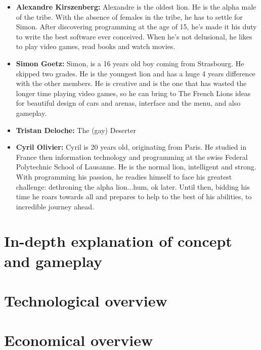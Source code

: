 \begin{itemize}
    \item \textbf{Alexandre Kirszenberg:}{
    Alexandre is the oldest lion. He is the alpha male of the tribe. With the absence of females in the tribe, he has to settle for Simon. After discovering programming at the age of 15, he’s made it his duty to write the best software ever conceived. When he’s not delusional, he likes to play video games, read books and watch movies.}\\


    \item \textbf{Simon Goetz:}{
    Simon, is a 16 years old boy coming from Strasbourg. He skipped two grades. He is the youngest lion and has a huge 4 years difference with the other members. He is creative and is the one that has wasted the longer time playing video games, so he can bring to The French Lions ideas for beautiful design of cars and arenas, interface and the menu, and also gameplay.}\\

    \item \textbf{Tristan Deloche:}{
    The (gay) Deserter}\\

    \item \textbf{Cyril Olivier:}{
    Cyril is 20 years old, originating from Paris. He studied in France then information technology and programming at the swiss Federal Polytechnic School of Lausanne. He is the normal lion, intelligent and strong. With programming his passion, he readies himself to face his greatest challenge: dethroning the alpha lion...hum, ok later. Until then, bidding his time he roars towards all and prepares to help to the best of his abilities, to incredible journey ahead.}\\
    
\end{itemize}


\chapter{In-depth explanation of concept and gameplay}


\chapter{Technological overview}


\chapter{Economical overview}


